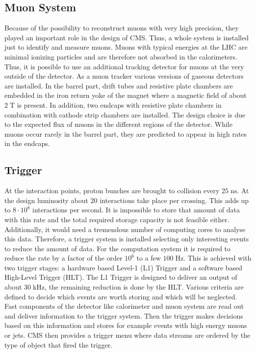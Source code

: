 \subsection{Muon System}
\label{sec:muonsystem}
	Because of the possibility to reconstruct muons with very high precision, they played an important role in the design of CMS. Thus, a whole system is installed just to identify and measure muons. Muons with typical energies at the LHC are minimal ionizing particles and are therefore not absorbed in the calorimeters. Thus, it is possible to use an additional tracking detector for muons at the very outside of the detector. As a muon tracker various versions of gaseous detectors are installed. In the barrel part, drift tubes and resistive plate chambers are embedded in the iron return yoke of the magnet where a magnetic field of about $2\;\text{T}$ is present. In addition, two endcaps with resistive plate chambers in combination with cathode strip chambers are installed. The design choice is due to the expected flux of muons in the different regions of the detector. While muons occur rarely in the barrel part, they are predicted to appear in high rates in the endcaps.

\subsection{Trigger}
\label{sec:trigger}
	At the interaction points, proton bunches are brought to collision every $25\;\text{ns}$. At the design luminosity about $20$ interactions take place per crossing. This adds up to $8 \cdot 10^8$ interactions per second. It is impossible to store that amount of data with this rate and the total required storage capacity is not feasible either. Additionally, it would need a tremendous number of computing cores to analyse this data. Therefore, a trigger system is installed selecting only interesting events to reduce the amount of data. For the computation system it is required to reduce the rate by a factor of the order $10^6$ to a few $100\;\text{Hz}$. This is achieved with two trigger stages: a hardware based Level-1 (L1) Trigger \cite{L1} and a software based High-Level Trigger (HLT)\cite{HLT}. The L1 Trigger is designed to deliver an output of about $30\;\text{kHz}$, the remaining reduction is done by the HLT. Various criteria are defined to decide which events are worth storing and which will be neglected. Fast components of the detector like calorimeter and muon system are read out and deliver information to the trigger system. Then the trigger makes decisions based on this information and stores for example events with high energy muons or jets. CMS then provides a trigger menu where data streams are ordered by the type of object that fired the trigger.

	